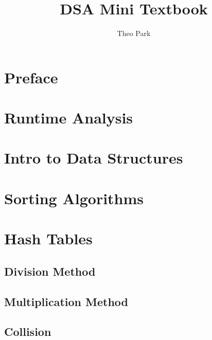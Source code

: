 \documentclass{report}
\title{DSA Mini Textbook}
\author{Theo Park}
\date{}
\begin{document}
\maketitle

\pagestyle{fancy}


\tableofcontents


\chapter*{Preface}


\chapter{Runtime Analysis}


\chapter{Intro to Data Structures}


\chapter{Sorting Algorithms}


\chapter{Hash Tables}

\section{Division Method}

\section{Multiplication Method}

\section{Collision}
\end{document}
